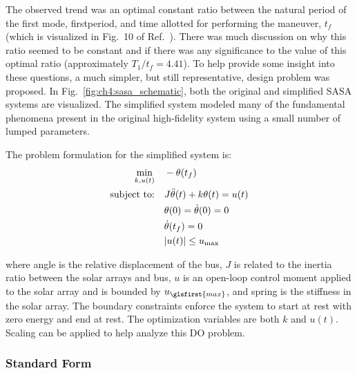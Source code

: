 The observed trend was an optimal constant ratio between the natural period of the first mode, \gls{firstperiod}, and time allotted for performing the maneuver, $t_f$ (which is visualized in Fig.~10 of Ref.~\cite{Chilan2017a}).
There was much discussion on why this ratio seemed to be constant and if there was any significance to the value of this optimal ratio (approximately $T_1/t_f = 4.41$).
To help provide some insight into these questions, a much simpler, but still representative, design problem was proposed.
In Fig.~\ref{fig:ch4:sasa_schematic}, both the original and simplified SASA systems are visualized. The simplified system modeled many of the fundamental phenomena present in the original high-fidelity system using a small number of lumped parameters.



The problem formulation for the simplified system is:
\begin{subequations}
\label{eq:ch4:sasa_prob_1}
\begin{align}
\min_{k,u(t)} \quad & - \theta(t_f) \\
\text{subject to:} \quad & J\ddot{\theta}(t) + k \theta(t) = u(t) \label{eq:ch4:diff_eq} \\
& \theta(0) = \dot{\theta}(0) = 0 \\
& \dot{\theta}(t_f) = 0 \\
& \lvert u(t)\rvert \leq u_{\max}
\end{align}
\end{subequations}

\noindent where \gls{angle} is the relative displacement of the bus, $J$ is related to the inertia ratio between the solar arrays and bus, $u$ is an open-loop control moment applied to the solar array and is bounded by $u_{\glsfirst{max}}$, and \gls{spring} is the stiffness in the solar array.
The boundary constraints enforce the system to start at rest with zero energy and end at rest.
The optimization variables are both $k$ and $u(t)$.
Scaling can be applied to help analyze this DO problem.

\subsubsection{Standard Form}

